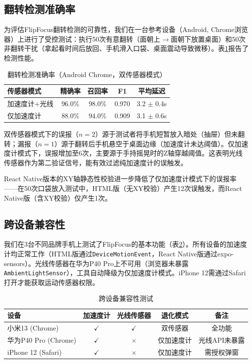 \documentclass[12pt,a4paper]{ctexart}
\begin{document}
\subsection{翻转检测准确率}

为评估FlipFocus翻转检测的可靠性，我们在一台参考设备（Android, Chrome浏览器）上进行了受控测试：执行50次有意翻转（面朝上$\rightarrow$面朝下放置桌面）和50次非翻转干扰（拿起看时间后放回、手机滑入口袋、桌面震动导致微移）。表\ref{tab:detection_accuracy}报告了检测性能。

\begin{table}[H]
\centering
\caption{翻转检测准确率（Android Chrome，双传感器模式）}
\label{tab:detection_accuracy}
\begin{tabular}{lcccc}
\toprule
\textbf{传感器模式} & \textbf{精确率} & \textbf{召回率} & \textbf{F1} & \textbf{平均延迟} \\
\midrule
加速度计+光线 & 96.0\% & 98.0\% & 0.970 & 3.2 $\pm$ 0.4s \\
仅加速度计 & 88.0\% & 94.0\% & 0.909 & 3.1 $\pm$ 0.6s \\
\bottomrule
\end{tabular}
\end{table}

双传感器模式下的误报（$n=2$）源于测试者将手机短暂放入暗处（抽屉）但未翻转；漏报（$n=1$）源于翻转后手机悬空于桌面边缘（加速度计未达阈值）。仅加速度计模式下，误报增加至6次，主要源于手持摇晃时的Z轴穿越阈值。这表明光线传感器作为第二验证信号，能有效过滤纯加速度计的误触发。

React Native版本的XY轴静态性校验进一步降低了仅加速度计模式下的误报率——在50次口袋放入测试中，HTML版（无XY校验）产生12次误触发，而React Native版（含XY校验）仅产生1次。

\subsection{跨设备兼容性}

我们在3台不同品牌手机上测试了FlipFocus的基本功能（表\ref{tab:device_compat}）。所有设备的加速度计均正常工作（HTML版通过\texttt{DeviceMotionEvent}，React Native版通过expo-sensors）。光线传感器在华为P40 Pro上不可用（浏览器未暴露\texttt{AmbientLightSensor}），工具自动降级为仅加速度计模式。iPhone 12需通过Safari打开才能获取运动传感器权限。

\begin{table}[H]
\centering
\caption{跨设备兼容性测试}
\label{tab:device_compat}
\begin{tabular}{@{}lcccc@{}}
\toprule
\textbf{设备} & \textbf{加速度计} & \textbf{光线传感器} & \textbf{退化模式} & \textbf{备注} \\
\midrule
小米13 (Chrome) & $\checkmark$ & $\checkmark$ & 双传感器 & 全功能 \\
华为P40 Pro (Chrome) & $\checkmark$ & $\times$ & 仅加速度计 & 光线API未暴露 \\
iPhone 12 (Safari) & $\checkmark$ & $\times$ & 仅加速度计 & 需授权弹窗 \\
\bottomrule
\end{tabular}
\end{table}
\end{document}
